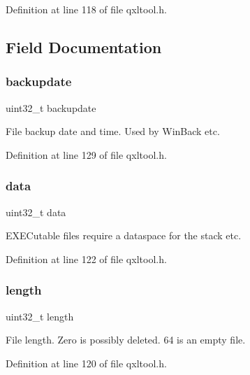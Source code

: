 Definition at line 118 of file qxltool.\+h.



\subsection{Field Documentation}
\mbox{\label{struct_q_l_d_i_r_a5ef1b85423e9bee3fd10b60a6f053516}} 
\subsubsection{\texorpdfstring{backupdate}{backupdate}}
{\footnotesize\ttfamily uint32\+\_\+t backupdate}

File backup date and time. Used by Win\+Back etc. 

Definition at line 129 of file qxltool.\+h.

\mbox{\label{struct_q_l_d_i_r_a1e43bf7d608e87228b625cca2c04d641}} 
\subsubsection{\texorpdfstring{data}{data}}
{\footnotesize\ttfamily uint32\+\_\+t data}

E\+X\+E\+Cutable files\textquotesingle{} require a dataspace for the stack etc. 

Definition at line 122 of file qxltool.\+h.

\mbox{\label{struct_q_l_d_i_r_aebb70c2aab3407a9f05334c47131a43b}} 
\subsubsection{\texorpdfstring{length}{length}}
{\footnotesize\ttfamily uint32\+\_\+t length}

File length. Zero is possibly deleted. 64 is an empty file. 

Definition at line 120 of file qxltool.\+h.

\mbox{\label{struct_q_l_d_i_r_a3a923b731660d8f74929feb1be3bfc56}} 
